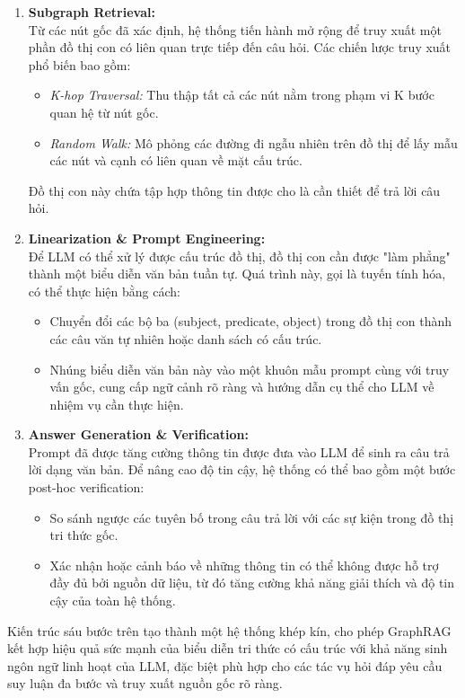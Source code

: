 \begin{enumerate}
    \item \textbf{Subgraph Retrieval:} \\
    Từ các nút gốc đã xác định, hệ thống tiến hành mở rộng để truy xuất một phần đồ thị con có liên quan trực tiếp đến câu hỏi. Các chiến lược truy xuất phổ biến bao gồm:
    \begin{itemize}
        \item \textit{K-hop Traversal:} Thu thập tất cả các nút nằm trong phạm vi K bước quan hệ từ nút gốc.
        \item \textit{Random Walk:} Mô phỏng các đường đi ngẫu nhiên trên đồ thị để lấy mẫu các nút và cạnh có liên quan về mặt cấu trúc.
    \end{itemize}
    Đồ thị con này chứa tập hợp thông tin được cho là cần thiết để trả lời câu hỏi.

    \item \textbf{Linearization \& Prompt Engineering:} \\
    Để LLM có thể xử lý được cấu trúc đồ thị, đồ thị con cần được "làm phẳng" thành một biểu diễn văn bản tuần tự. Quá trình này, gọi là tuyến tính hóa, có thể thực hiện bằng cách:
    \begin{itemize}
        \item Chuyển đổi các bộ ba (subject, predicate, object) trong đồ thị con thành các câu văn tự nhiên hoặc danh sách có cấu trúc.
        \item Nhúng biểu diễn văn bản này vào một khuôn mẫu prompt cùng với truy vấn gốc, cung cấp ngữ cảnh rõ ràng và hướng dẫn cụ thể cho LLM về nhiệm vụ cần thực hiện.
    \end{itemize}

    \item \textbf{Answer Generation \& Verification:} \\
    Prompt đã được tăng cường thông tin được đưa vào LLM để sinh ra câu trả lời dạng văn bản. Để nâng cao độ tin cậy, hệ thống có thể bao gồm một bước post-hoc verification:
    \begin{itemize}
        \item So sánh ngược các tuyên bố trong câu trả lời với các sự kiện trong đồ thị tri thức gốc.
        \item Xác nhận hoặc cảnh báo về những thông tin có thể không được hỗ trợ đầy đủ bởi nguồn dữ liệu, từ đó tăng cường khả năng giải thích và độ tin cậy của toàn hệ thống.
    \end{itemize}
\end{enumerate}

Kiến trúc sáu bước trên tạo thành một hệ thống khép kín, cho phép GraphRAG kết hợp hiệu quả sức mạnh của biểu diễn tri thức có cấu trúc với khả năng sinh ngôn ngữ linh hoạt của LLM, đặc biệt phù hợp cho các tác vụ hỏi đáp yêu cầu suy luận đa bước và truy xuất nguồn gốc rõ ràng.